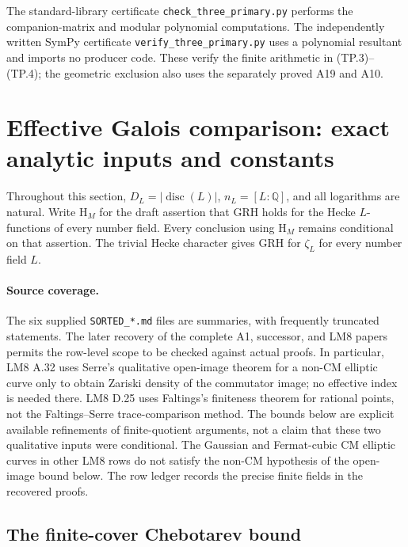 \documentclass[11pt,a4paper]{article}
\begin{document}
The standard-library certificate \texttt{check\_three\_primary.py}
performs the companion-matrix and modular polynomial computations.
The independently written SymPy certificate
\texttt{verify\_three\_primary.py} uses a polynomial resultant
and imports no producer code. These verify the finite arithmetic
in (TP.3)--(TP.4); the geometric exclusion also uses the separately
proved A19 and A10.


\section{Effective Galois comparison: exact analytic inputs and constants}
\label{sec:effective-galois}

Throughout this section, $D_L=|\operatorname{disc}(L)|$, $n_L=[L:\mathbb Q]$, and all logarithms are natural.  Write $\mathrm{H}_M$ for the draft assertion that GRH holds for the Hecke $L$-functions of every number field.  Every conclusion using $\mathrm{H}_M$ remains conditional on that assertion.  The trivial Hecke character gives GRH for $\zeta_L$ for every number field $L$.

\paragraph{Source coverage.}
The six supplied \texttt{SORTED\_*.md} files are summaries, with frequently truncated statements.  The later recovery of the complete A1, successor, and LM8 papers permits the row-level scope to be checked against actual proofs.  In particular, LM8 A.32 uses Serre's qualitative open-image theorem for a non-CM elliptic curve only to obtain Zariski density of the commutator image; no effective index is needed there.  LM8 D.25 uses Faltings's finiteness theorem for rational points, not the Faltings--Serre trace-comparison method.  The bounds below are explicit available refinements of finite-quotient arguments, not a claim that these two qualitative inputs were conditional.  The Gaussian and Fermat-cubic CM elliptic curves in other LM8 rows do not satisfy the non-CM hypothesis of the open-image bound below.  The row ledger records the precise finite fields in the recovered proofs.

\subsection{The finite-cover Chebotarev bound}
\end{document}
